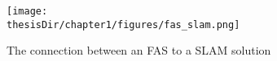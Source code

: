\begin{figure}[h]
  \centering
  \captionsetup{justification=centering}
  \texttt{[image: \\thesisDir/chapter1/figures/fas\_slam.png]}
  \caption{The connection between an FAS to a SLAM solution}
  \label{fig:fas_slam}
\end{figure}

